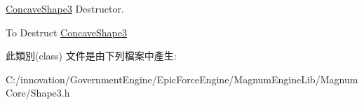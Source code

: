 \hyperlink{class_i_dream_sky_1_1_concave_shape3}{Concave\+Shape3} Destructor. 

To Destruct \hyperlink{class_i_dream_sky_1_1_concave_shape3}{Concave\+Shape3} 

此類別(class) 文件是由下列檔案中產生\+:\begin{DoxyCompactItemize}
\item 
C\+:/innovation/\+Government\+Engine/\+Epic\+Force\+Engine/\+Magnum\+Engine\+Lib/\+Magnum\+Core/Shape3.\+h\end{DoxyCompactItemize}
